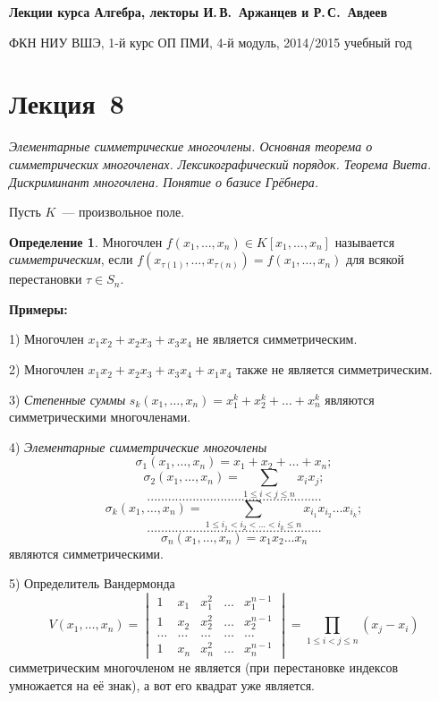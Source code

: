 \documentclass[a4paper,10pt]{amsart}
\theoremstyle{definition}
\newtheorem{definition}{Определение}
\theoremstyle{remark}
\begin{document}
%
\sloppy
%
\centerline{\large \bf Лекции курса \guillemotleft
Алгебра\guillemotright{}, лекторы И.\,В.~Аржанцев и Р.\,С.~Авдеев}

\smallskip

\centerline{\large ФКН НИУ ВШЭ, 1-й курс ОП ПМИ, 4-й модуль,
2014/2015 учебный год}


\bigskip

\section*{Лекция~8}

\medskip

{\it Элементарные симметрические многочлены. Основная теорема о
симметрических многочленах. Лексикографический порядок. Теорема
Виета. Дискриминант многочлена. Понятие о базисе Грёбнера.}

\medskip

Пусть $K$~--- произвольное поле.

\begin{definition}
Многочлен $f(x_1,\ldots,x_n)\in K[x_1,\ldots,x_n]$ называется {\it
симметрическим}, если
$f(x_{\tau(1)},\ldots,x_{\tau(n)})=f(x_1,\ldots,x_n)$ для всякой
перестановки $\tau \in S_n$.
\end{definition}

\textbf{Примеры:}

1) Многочлен $x_1x_2 + x_2x_3 + x_3x_4$ не является симметрическим.

2) Многочлен $x_1 x_2 + x_2 x_3 + x_3 x_4 + x_1 x_4$ также не
является симметрическим.

3) {\it Степенные суммы} $s_k(x_1, \ldots, x_n) = x_1^k + x_2^k +
\ldots + x_n^k$ являются симметрическими многочленами.

4) {\it Элементарные симметрические многочлены}
$$
\sigma_1(x_1, \ldots, x_n) = x_1 + x_2 + \ldots + x_n;
$$
$$
\sigma_2(x_1, \ldots, x_n) = \sum \limits_{1 \leqslant i < j
\leqslant n} x_i x_j;
$$
$$
..................................................
$$
$$
\sigma_k(x_1, \ldots, x_n) = \sum \limits_{1 \leqslant i_1 < i_2 <
\ldots < i_k \leqslant n} x_{i_1} x_{i_2} \ldots x_{i_k};
$$
$$
..................................................
$$
$$
\sigma_n(x_1, \ldots, x_n) = x_1 x_2 \ldots x_n
$$
являются симметрическими.

5) Определитель Вандермонда
$$
V(x_1, \ldots, x_n) =
\begin{vmatrix}
1 & x_1 & x_1^2 & \ldots & x_1^{n-1} \\
1 & x_2 & x_2^2 & \ldots & x_2^{n-1} \\
\ldots & \ldots & \ldots & \ldots & \ldots \\
1 & x_n & x_n^2 & \ldots & x_n^{n-1}
\end{vmatrix} =
\prod \limits_{1 \leqslant i < j \leqslant n} (x_j - x_i)
$$
симметрическим многочленом не является (при перестановке индексов
умножается на её знак), а вот его квадрат уже является.
\end{document}
